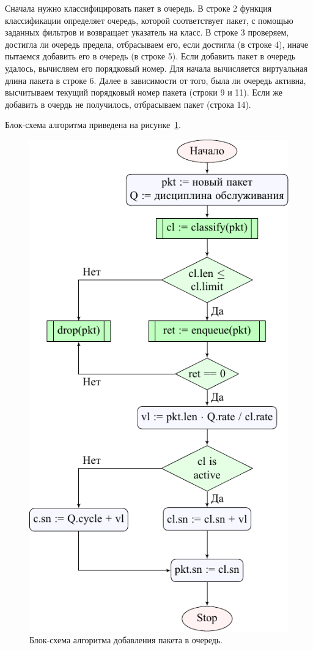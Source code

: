 			Сначала нужно классифицировать пакет в очередь.
			В строке 2 функция классификации определяет очередь, которой
			соответствует пакет, с помощью заданных фильтров
			и возвращает указатель на класс. В строке 3 проверяем,
			достигла ли очередь предела, отбрасываем его, если достигла (в строке 4),
			иначе пытаемся добавить его в очередь (в строке 5). Если
			добавить пакет в очередь удалось, вычисляем его порядковый номер.
			Для начала вычисляется виртуальная длина пакета в строке 6. Далее
			в зависимости от того, была ли очередь активна, высчитываем 
			текущий порядковый номер пакета (строки 9 и 11). Если же добавить
			в очердь не получилось, отбрасываем пакет (строка 14).

			Блок-схема алгоритма приведена на рисунке~\ref{pic:enqchart}.
            \begin{figure}[ht!]
                \center
                \includegraphics{pdfimages/enq_algo.pdf}
                \caption{Блок-схема алгоритма добавления пакета в очередь.}
        		\label{pic:enqchart}
            \end{figure}

